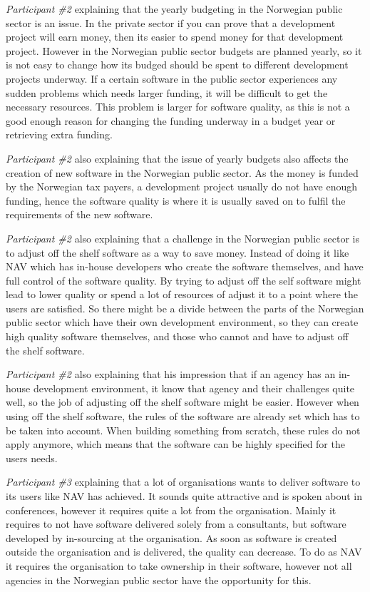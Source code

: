 \textit{Participant \#2} explaining that the yearly budgeting in the Norwegian public sector is an issue. In the private sector if you can prove that a development project will earn money, then its easier to spend money for that development project. However in the Norwegian public sector budgets are planned yearly, so it is not easy to change how its budged should be spent to different development projects underway. If a certain software in the public sector experiences any sudden problems which needs larger funding, it will be difficult to get the necessary resources. This problem is larger for software quality, as this is not a good enough reason for changing the funding underway in a budget year or retrieving extra funding.

\textit{Participant \#2} also explaining that the issue of yearly budgets also affects the creation of new software in the Norwegian public sector. As the money is funded by the Norwegian tax payers, a development project usually do not have enough funding, hence the software quality is where it is usually saved on to fulfil the requirements of the new software.

\textit{Participant \#2} also explaining that a challenge in the Norwegian public sector is to adjust off the shelf software as a way to save money. Instead of doing it like NAV which has in-house developers who create the software themselves, and have full control of the software quality. By trying to adjust off the self software might lead to lower quality or spend a lot of resources of adjust it to a point where the users are satisfied. So there might be a divide between the parts of the Norwegian public sector which have their own development environment, so they can create high quality software themselves, and those who cannot and have to adjust off the shelf software.  

\textit{Participant \#2} also explaining that his impression that if an agency has an in-house development environment, it know that agency and their challenges quite well, so the job of adjusting off the shelf software might be easier. However when using off the shelf software, the rules of the software are already set which has to be taken into account. When building something from scratch, these rules do not apply anymore, which means that the software can be highly specified for the users needs.

\textit{Participant \#3} explaining that a lot of organisations wants to deliver software to its users like NAV has achieved. It sounds quite attractive and is spoken about in conferences, however it requires quite a lot from the organisation. Mainly it requires to not have software delivered solely from a consultants, but software developed by in-sourcing at the organisation. As soon as software is created outside the organisation and is delivered, the quality can decrease. To do as NAV it requires the organisation to take ownership in their software, however not all agencies in the Norwegian public sector have the opportunity for this.

